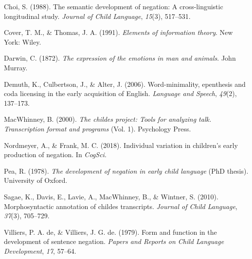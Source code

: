 \documentclass[10pt, letterpaper]{article}
\begin{document}
\leavevmode\hypertarget{ref-choi1988semantic}{}%
Choi, S. (1988). The semantic development of negation: A
cross-linguistic longitudinal study. \emph{Journal of Child Language},
\emph{15}(3), 517--531.

\leavevmode\hypertarget{ref-cover_elements_1991}{}%
Cover, T. M., \& Thomas, J. A. (1991). \emph{Elements of information
theory}. New York: Wiley.

\leavevmode\hypertarget{ref-darwin1872expression}{}%
Darwin, C. (1872). \emph{The expression of the emotions in man and
animals}. John Murray.

\leavevmode\hypertarget{ref-demuth2006word}{}%
Demuth, K., Culbertson, J., \& Alter, J. (2006). Word-minimality,
epenthesis and coda licensing in the early acquisition of English.
\emph{Language and Speech}, \emph{49}(2), 137--173.

\leavevmode\hypertarget{ref-macwhinney2000childes}{}%
MacWhinney, B. (2000). \emph{The childes project: Tools for analyzing
talk. Transcription format and programs} (Vol. 1). Psychology Press.

\leavevmode\hypertarget{ref-nordmeyer2018individual}{}%
Nordmeyer, A., \& Frank, M. C. (2018). Individual variation in
children's early production of negation. In \emph{CogSci}.

\leavevmode\hypertarget{ref-pea1978}{}%
Pea, R. (1978). \emph{The development of negation in early child
language} (PhD thesis). University of Oxford.

\leavevmode\hypertarget{ref-sagae2010morphosyntactic}{}%
Sagae, K., Davis, E., Lavie, A., MacWhinney, B., \& Wintner, S. (2010).
Morphosyntactic annotation of childes transcripts. \emph{Journal of
Child Language}, \emph{37}(3), 705--729.

\leavevmode\hypertarget{ref-de1979form}{}%
Villiers, P. A. de, \& Villiers, J. G. de. (1979). Form and function in
the development of sentence negation. \emph{Papers and Reports on Child
Language Development}, \emph{17}, 57--64.


\end{document}
